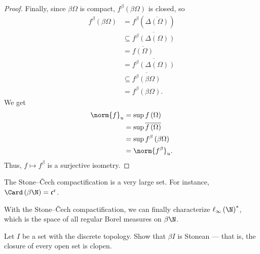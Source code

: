 \documentclass[10pt]{mypackage}
\begin{document}
\begin{proof}
  Finally, since $\beta\Omega$ is compact, $f^{\beta}\left(\beta\Omega\right)$ is closed, so
  \begin{align*}
    f^{\beta}\left(\beta\Omega\right) &= f^{\beta}\left(\overline{\Delta\left(\Omega\right)}\right)\\
                                      &\subseteq \overline{f^{\beta}\left(\Delta\left(\Omega\right)\right)}\\
                                      &= \overline{f\left(\Omega\right)}\\
                                      &= \overline{f^{\beta}\left(\Delta\left(\Omega\right)\right)}\\
                                      &\subseteq \overline{f^{\beta}\left(\beta\Omega\right)}\\
                                      &= f^{\beta}\left(\beta\Omega\right).
  \end{align*}
  We get
  \begin{align*}
    \norm{f}_{u} &= \sup f\left(\Omega\right)\\
                 &= \sup \overline{f\left(\Omega\right)}\\
                 &= \sup f^{\beta}\left(\beta\Omega\right)\\
                 &= \norm{f^{\beta}}_{u}.
  \end{align*}
  Thus, $f \mapsto f^{\beta}$ is a surjective isometry.
\end{proof}
\begin{remark}
  The Stone--Čech compactification is a very large set. For instance, $\Card\left(\beta \N\right) = \mathfrak{c}^{\mathfrak{c}}$.
\end{remark}
\begin{remark}
  With the Stone--Čech compactification, we can finally characterize $\ell_{\infty}\left(\N\right)^{\ast}$, which is the space of all regular Borel measures on $\beta \N$.
\end{remark}
\begin{exercise}
  Let $I$ be a set with the discrete topology. Show that $\beta I$ is Stonean --- that is, the closure of every open set is clopen.
\end{exercise}
\end{document}

